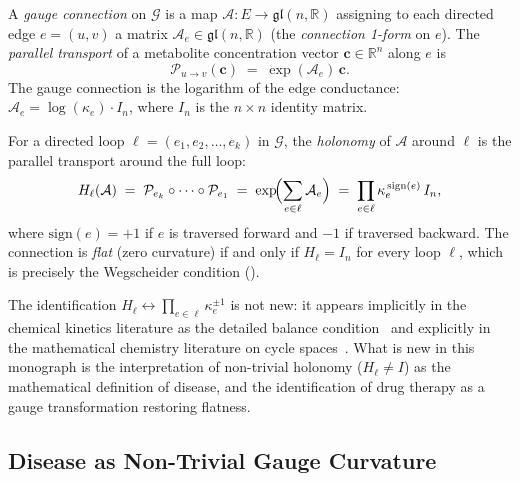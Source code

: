 \begin{definition}
\label{def:ch11-gauge-connection}
A \emph{gauge connection} on $\mathcal{G}$ is a map
$\mathcal{A}: E \to \mathfrak{gl}(n,\mathbb{R})$ assigning to each directed
edge $e = (u,v)$ a matrix $\mathcal{A}_e \in \mathfrak{gl}(n,\mathbb{R})$
(the \emph{connection 1-form} on $e$).  The \emph{parallel transport} of a
metabolite concentration vector $\mathbf{c} \in \mathbb{R}^n$ along $e$ is
\[
  \mathcal{P}_{u \to v}(\mathbf{c}) \;=\; \exp(\mathcal{A}_e)\,\mathbf{c}.
\]
The gauge connection is the logarithm of the edge conductance:
$\mathcal{A}_e = \log(\kappa_e) \cdot I_n$, where $I_n$ is the $n \times n$
identity matrix.
\end{definition}

\begin{definition}
\label{def:ch11-curvature}
For a directed loop $\ell = (e_1, e_2, \ldots, e_k)$ in $\mathcal{G}$, the
\emph{holonomy} of $\mathcal{A}$ around $\ell$ is the parallel transport
around the full loop:
\begin{equation}
\label{eq:ch11-holonomy-parallel-transport}
  H_\ell(\mathcal{A}) \;=\; \mathcal{P}_{e_k} \circ \cdots \circ \mathcal{P}_{e_1}
  \;=\; \exp\!\Bigl(\sum_{e \in \ell} \mathcal{A}_e\Bigr)
  \;=\; \prod_{e \in \ell} \kappa_e^{\,\mathrm{sign}(e)}\,I_n,
\end{equation}
where $\mathrm{sign}(e) = +1$ if $e$ is traversed forward and $-1$ if
traversed backward.  The connection is \emph{flat} (zero curvature) if and
only if $H_\ell = I_n$ for every loop $\ell$, which is precisely the
Wegscheider condition ().
\end{definition}

The identification $H_\ell \leftrightarrow \prod_{e \in \ell} \kappa_e^{\pm 1}$
is not new: it appears implicitly in the chemical kinetics literature as the
detailed balance condition~\citep{Wegscheider1901} and explicitly in the
mathematical chemistry literature on cycle spaces~\citep{Feinberg1972}.
What is new in this monograph is the interpretation of non-trivial holonomy
($H_\ell \neq I$) as the mathematical definition of disease, and the
identification of drug therapy as a gauge transformation restoring flatness.

\subsection{Disease as Non-Trivial Gauge Curvature}
\label{subsec:ch11-disease-curvature}


